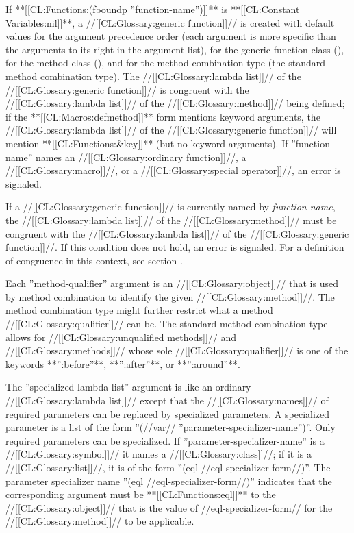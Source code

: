 If **[[CL:Functions:(fboundp ''function-name'')]]** is **[[CL:Constant Variables:nil]]**, a //[[CL:Glossary:generic function]]// is created with default values for the argument precedence order (each argument is more specific than the arguments to its right in the argument list), for the generic function class (), for the method class (), and for the method combination type (the standard method combination type). The //[[CL:Glossary:lambda list]]// of the //[[CL:Glossary:generic function]]// is congruent with the //[[CL:Glossary:lambda list]]// of the //[[CL:Glossary:method]]// being defined; if the **[[CL:Macros:defmethod]]** form mentions keyword arguments, the //[[CL:Glossary:lambda list]]// of the //[[CL:Glossary:generic function]]// will mention **[[CL:Functions:&key]]** (but no keyword arguments). If ''function-name'' names an //[[CL:Glossary:ordinary function]]//, a //[[CL:Glossary:macro]]//, or a //[[CL:Glossary:special operator]]//, an error is signaled.

If a //[[CL:Glossary:generic function]]// is currently named by {\it function-name}, the //[[CL:Glossary:lambda list]]// of the //[[CL:Glossary:method]]// must be congruent with the //[[CL:Glossary:lambda list]]// of the //[[CL:Glossary:generic function]]//. If this condition does not hold, an error is signaled. For a definition of congruence in this context, see section {\secref\GFMethodLambdaListCongruency}.


Each ''method-qualifier'' argument is an //[[CL:Glossary:object]]// that is used by method combination to identify the given //[[CL:Glossary:method]]//. The method combination type might further restrict what a method //[[CL:Glossary:qualifier]]// can be. The standard method combination type allows for //[[CL:Glossary:unqualified methods]]// and //[[CL:Glossary:methods]]// whose sole //[[CL:Glossary:qualifier]]// is one of the keywords **'':before''**, **'':after''**, or **'':around''**.

The ''specialized-lambda-list'' argument is like an ordinary //[[CL:Glossary:lambda list]]// except that the //[[CL:Glossary:names]]// of required parameters can be replaced by specialized parameters. A specialized parameter is a list of the form ''(//var// ''parameter-specializer-name'')''. Only required parameters can be specialized. If ''parameter-specializer-name'' is a //[[CL:Glossary:symbol]]// it names a //[[CL:Glossary:class]]//; if it is a //[[CL:Glossary:list]]//, it is of the form ''(eql //eql-specializer-form//)''. The parameter specializer name ''(eql //eql-specializer-form//)'' indicates that the corresponding argument must be **[[CL:Functions:eql]]** to the //[[CL:Glossary:object]]// that is the value of //eql-specializer-form// for the //[[CL:Glossary:method]]// to be applicable.

